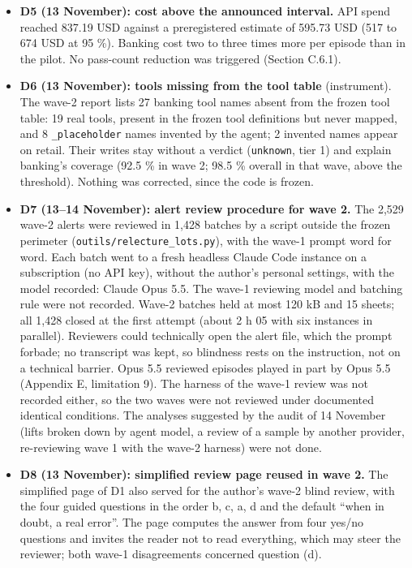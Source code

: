 \begin{itemize}
\item
  \textbf{D5 (13 November): cost above the announced interval.} API spend reached 837.19 USD against a preregistered estimate of 595.73 USD (517 to 674 USD at 95 \%). Banking cost two to three times more per episode than in the pilot. No pass-count reduction was triggered (Section C.6.1).
\item
  \textbf{D6 (13 November): tools missing from the tool table} (instrument). The wave-2 report lists 27 banking tool names absent from the frozen tool table: 19 real tools, present in the frozen tool definitions but never mapped, and 8 \texttt{\_\allowbreak{}placeholder} names invented by the agent; 2 invented names appear on retail. Their writes stay without a verdict (\texttt{unknown}, tier 1) and explain banking's coverage (92.5 \% in wave 2; 98.5 \% overall in that wave, above the threshold). Nothing was corrected, since the code is frozen.
\item
  \textbf{D7 (13--14 November): alert review procedure for wave 2.} The 2,529 wave-2 alerts were reviewed in 1,428 batches by a script outside the frozen perimeter (\texttt{outils/\allowbreak{}relecture\_\allowbreak{}lots.\allowbreak{}py}), with the wave-1 prompt word for word. Each batch went to a fresh headless Claude Code instance on a subscription (no API key), without the author's personal settings, with the model recorded: Claude Opus 5.5. The wave-1 reviewing model and batching rule were not recorded. Wave-2 batches held at most 120 kB and 15 sheets; all 1,428 closed at the first attempt (about 2 h 05 with six instances in parallel). Reviewers could technically open the alert file, which the prompt forbade; no transcript was kept, so blindness rests on the instruction, not on a technical barrier. Opus 5.5 reviewed episodes played in part by Opus 5.5 (Appendix E, limitation 9). The harness of the wave-1 review was not recorded either, so the two waves were not reviewed under documented identical conditions. The analyses suggested by the audit of 14 November (lifts broken down by agent model, a review of a sample by another provider, re-reviewing wave 1 with the wave-2 harness) were not done.
\item
  \textbf{D8 (13 November): simplified review page reused in wave 2.} The simplified page of D1 also served for the author's wave-2 blind review, with the four guided questions in the order b, c, a, d and the default ``when in doubt, a real error''. The page computes the answer from four yes/no questions and invites the reader not to read everything, which may steer the reviewer; both wave-1 disagreements concerned question (d).

\end{itemize}
